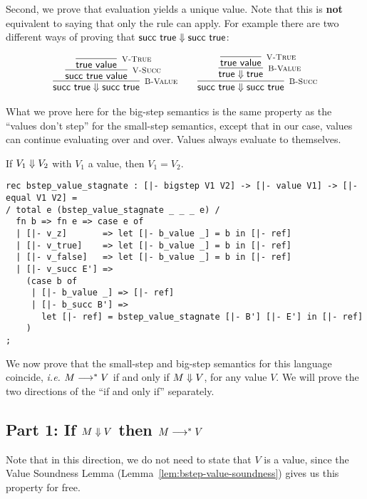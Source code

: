 Second, we  prove that evaluation yields a unique value. Note that
this is {\bf not} equivalent to saying that only the \BValue rule can
apply. For example there are two different ways of proving that
$\textsf{succ}~\textsf{true} \Downarrow \textsf{succ}~\textsf{true}$:

\[
\begin{array}{c@{\qquad}c}
  \infer[\BValue]{\tmsucc \tmtrue \BSteps \tmsucc \tmtrue}
  {\infer[\VSucc]{\tmsucc \tmtrue \Value}
    {\infer[\VTrue]{\tmtrue \Value}{}}} &

  \infer[\BSucc]{\tmsucc \tmtrue \BSteps \tmsucc \tmtrue}
  {\infer[\BValue]{\tmtrue \BSteps \tmtrue}
    {\infer[\VTrue]{\tmtrue \Value}{}}}
\end{array}
\]

What we prove here for the big-step semantics is the same property as the
``values don't step'' for the small-step semantics, except that in our case,
values can continue evaluating over and over. Values always
evaluate to themselves.

\begin{lemma}
  \label{lem:bstep-values-stagnate}
  If $V_1 \Downarrow V_2$ with $V_1$ a value, then $V_1 = V_2$.
\end{lemma}

\begin{lstlisting}
rec bstep_value_stagnate : [|- bigstep V1 V2] -> [|- value V1] -> [|- equal V1 V2] =
/ total e (bstep_value_stagnate _ _ _ e) /
  fn b => fn e => case e of
  | [|- v_z]       => let [|- b_value _] = b in [|- ref]
  | [|- v_true]    => let [|- b_value _] = b in [|- ref]
  | [|- v_false]   => let [|- b_value _] = b in [|- ref]
  | [|- v_succ E'] =>
    (case b of
     | [|- b_value _] => [|- ref]
     | [|- b_succ B'] =>
       let [|- ref] = bstep_value_stagnate [|- B'] [|- E'] in [|- ref]
    )
;
\end{lstlisting}

We now prove that the small-step and big-step semantics for this language
coincide, {\em i.e.} $M \longrightarrow^* V$ if and only if $M \Downarrow V$, for any value
 $V$. We will prove the two directions of the ``if and only if'' separately.

\subsection{Part 1: If $M \Downarrow V$ then $M \longrightarrow^* V$}

Note that in this direction, we do not need to state that $V$ is a value, since
the Value Soundness Lemma (Lemma~\ref{lem:bstep-value-soundness}) gives us this
property for free.


